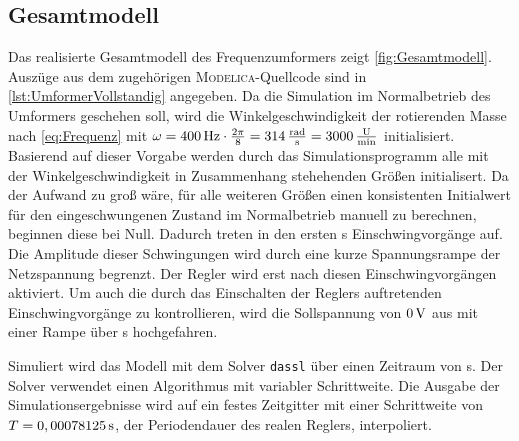 \subsection{Gesamtmodell}\label{gesamtmodell}
Das realisierte Gesamtmodell des Frequenzumformers zeigt \cref{fig:Gesamtmodell}. Auszüge aus dem zugehörigen \textsc{Modelica}-Quellcode sind in \cref{lst:UmformerVollstandig} angegeben. Da die Simulation im Normalbetrieb des Umformers geschehen soll, wird die Winkelgeschwindigkeit der rotierenden Masse nach \cref{eq:Frequenz} mit $\omega = \unit[400]{Hz}\cdot \frac{2\pi}{8} = \unit[314]{\frac{rad}{s}} = \unit[3000]{\frac{U}{min}}$ initialisiert. Basierend auf dieser Vorgabe werden durch das Simulationsprogramm alle mit der Winkelgeschwindigkeit in Zusammenhang stehehenden Größen initialisert. Da der Aufwand zu groß wäre, für alle weiteren Größen einen konsistenten Initialwert für den eingeschwungenen Zustand im Normalbetrieb manuell zu berechnen, beginnen diese bei Null. Dadurch treten in den ersten \unit[0,7]{s} Einschwingvorgänge auf. Die Amplitude dieser Schwingungen wird durch eine kurze Spannungsrampe der Netzspannung begrenzt. Der Regler wird erst nach diesen Einschwingvorgängen aktiviert. Um auch die durch das Einschalten der Reglers auftretenden Einschwingvorgänge zu kontrollieren, wird die Sollspannung von $\unit[0]{V}$ aus mit einer Rampe über \unit[0,3]{s} hochgefahren.

Simuliert wird das Modell mit dem Solver \texttt{dassl} über einen Zeitraum von \unit[3]{s}. Der Solver verwendet einen Algorithmus mit variabler Schrittweite. Die Ausgabe der Simulationsergebnisse wird auf ein festes Zeitgitter mit einer Schrittweite von $T=\unit[0,00078125]{s}$, der Periodendauer des realen Reglers, interpoliert. 
